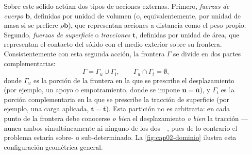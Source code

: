 Sobre este sólido actúan dos tipos de acciones externas. Primero, \emph{fuerzas de cuerpo} $\bm{b}$, definidas por unidad de volumen (o, equivalentemente, por unidad de masa si se prefiere $\rho\bm{b}$), que representan acciones a distancia como el peso propio. Segundo, \emph{fuerzas de superficie} o \emph{tracciones} $\bm{t}$, definidas por unidad de área, que representan el contacto del sólido con el medio exterior sobre su frontera. Consistentemente con esta segunda acción, la frontera $\Gamma$ se divide en dos partes complementarias:
\[
\Gamma = \Gamma_u \cup \Gamma_t, \qquad \Gamma_u \cap \Gamma_t = \emptyset,
\]
donde $\Gamma_u$ es la porción de la frontera en la que se prescribe el desplazamiento (por ejemplo, un apoyo o empotramiento, donde se impone $\bm{u}=\bar{\bm{u}}$), y $\Gamma_t$ es la porción complementaria en la que se prescribe la tracción de superficie (por ejemplo, una carga aplicada, $\bm{t}=\bar{\bm{t}}$). Esta partición no es arbitraria: en cada punto de la frontera debe conocerse \emph{o bien} el desplazamiento \emph{o bien} la tracción —nunca ambos simultáneamente ni ninguno de los dos—, pues de lo contrario el problema estaría sobre- o sub-determinado. La \cref{fig:cap02-dominio} ilustra esta configuración geométrica general.


